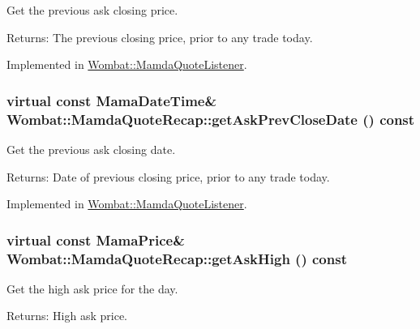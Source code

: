 Get the previous ask closing price. 

\begin{Desc}
\item[Returns:]The previous closing price, prior to any trade today. \end{Desc}


Implemented in \hyperlink{classWombat_1_1MamdaQuoteListener_e0afe79ab166febbcf94861365dc31c7}{Wombat::Mamda\-Quote\-Listener}.\hypertarget{classWombat_1_1MamdaQuoteRecap_f18eefde8f4c853642da3176bb7cf84e}{
\subsubsection[getAskPrevCloseDate]{\setlength{\rightskip}{0pt plus 5cm}virtual const Mama\-Date\-Time\& Wombat::Mamda\-Quote\-Recap::get\-Ask\-Prev\-Close\-Date () const}}
\label{classWombat_1_1MamdaQuoteRecap_f18eefde8f4c853642da3176bb7cf84e}


Get the previous ask closing date. 

\begin{Desc}
\item[Returns:]Date of previous closing price, prior to any trade today. \end{Desc}


Implemented in \hyperlink{classWombat_1_1MamdaQuoteListener_58dfc1cbbf19d48e01d51ee715256c15}{Wombat::Mamda\-Quote\-Listener}.\hypertarget{classWombat_1_1MamdaQuoteRecap_d775066ddd925c5cfc3f736b6da9b3d8}{
\subsubsection[getAskHigh]{\setlength{\rightskip}{0pt plus 5cm}virtual const Mama\-Price\& Wombat::Mamda\-Quote\-Recap::get\-Ask\-High () const}}
\label{classWombat_1_1MamdaQuoteRecap_d775066ddd925c5cfc3f736b6da9b3d8}


Get the high ask price for the day. 

\begin{Desc}
\item[Returns:]High ask price. \end{Desc}


